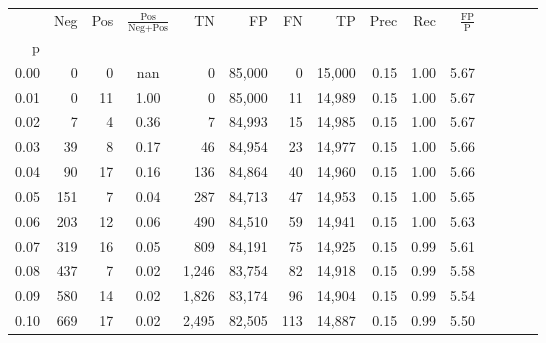 \begin{tabular}{rrrcrrrrrrrrrrr}
\toprule
{} &    Neg &  Pos & $\frac{\text{Pos}}{\text{Neg}+\text{Pos}}$ &      TN &      FP &      FN &      TP &  Prec &   Rec & $\frac{\text{FP}}{\text{P}}$ \\
p    &        &      &                                            &         &         &         &         &       &       &                              \\
\midrule
0.00 &      0 &    0 &                                        nan &       0 &  85,000 &       0 &  15,000 &  0.15 &  1.00 &                         5.67 \\
0.01 &      0 &   11 &                                       1.00 &       0 &  85,000 &      11 &  14,989 &  0.15 &  1.00 &                         5.67 \\
0.02 &      7 &    4 &                                       0.36 &       7 &  84,993 &      15 &  14,985 &  0.15 &  1.00 &                         5.67 \\
0.03 &     39 &    8 &                                       0.17 &      46 &  84,954 &      23 &  14,977 &  0.15 &  1.00 &                         5.66 \\
0.04 &     90 &   17 &                                       0.16 &     136 &  84,864 &      40 &  14,960 &  0.15 &  1.00 &                         5.66 \\
0.05 &    151 &    7 &                                       0.04 &     287 &  84,713 &      47 &  14,953 &  0.15 &  1.00 &                         5.65 \\
0.06 &    203 &   12 &                                       0.06 &     490 &  84,510 &      59 &  14,941 &  0.15 &  1.00 &                         5.63 \\
0.07 &    319 &   16 &                                       0.05 &     809 &  84,191 &      75 &  14,925 &  0.15 &  0.99 &                         5.61 \\
0.08 &    437 &    7 &                                       0.02 &   1,246 &  83,754 &      82 &  14,918 &  0.15 &  0.99 &                         5.58 \\
0.09 &    580 &   14 &                                       0.02 &   1,826 &  83,174 &      96 &  14,904 &  0.15 &  0.99 &                         5.54 \\
0.10 &    669 &   17 &                                       0.02 &   2,495 &  82,505 &     113 &  14,887 &  0.15 &  0.99 &                         5.50 \\

\end{tabular}
